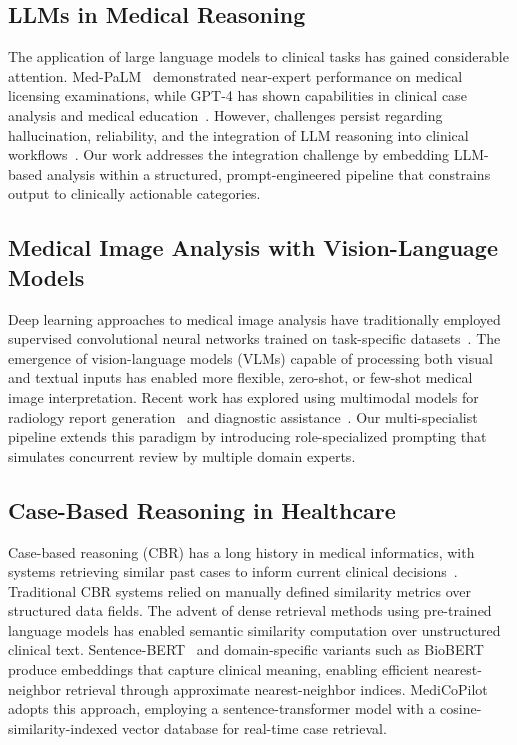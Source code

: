 \documentclass[conference]{IEEEtran}
\begin{document}
\subsection{LLMs in Medical Reasoning}
The application of large language models to clinical tasks has gained considerable attention. Med-PaLM~\cite{b8} demonstrated near-expert performance on medical licensing examinations, while GPT-4 has shown capabilities in clinical case analysis and medical education~\cite{b5}. However, challenges persist regarding hallucination, reliability, and the integration of LLM reasoning into clinical workflows~\cite{b9}. Our work addresses the integration challenge by embedding LLM-based analysis within a structured, prompt-engineered pipeline that constrains output to clinically actionable categories.

\subsection{Medical Image Analysis with Vision-Language Models}
Deep learning approaches to medical image analysis have traditionally employed supervised convolutional neural networks trained on task-specific datasets~\cite{b10}. The emergence of vision-language models (VLMs) capable of processing both visual and textual inputs has enabled more flexible, zero-shot, or few-shot medical image interpretation. Recent work has explored using multimodal models for radiology report generation~\cite{b11} and diagnostic assistance~\cite{b12}. Our multi-specialist pipeline extends this paradigm by introducing role-specialized prompting that simulates concurrent review by multiple domain experts.

\subsection{Case-Based Reasoning in Healthcare}
Case-based reasoning (CBR) has a long history in medical informatics, with systems retrieving similar past cases to inform current clinical decisions~\cite{b13}. Traditional CBR systems relied on manually defined similarity metrics over structured data fields. The advent of dense retrieval methods using pre-trained language models has enabled semantic similarity computation over unstructured clinical text. Sentence-BERT~\cite{b6} and domain-specific variants such as BioBERT~\cite{b14} produce embeddings that capture clinical meaning, enabling efficient nearest-neighbor retrieval through approximate nearest-neighbor indices. MediCoPilot adopts this approach, employing a sentence-transformer model with a cosine-similarity-indexed vector database for real-time case retrieval.
\end{document}
